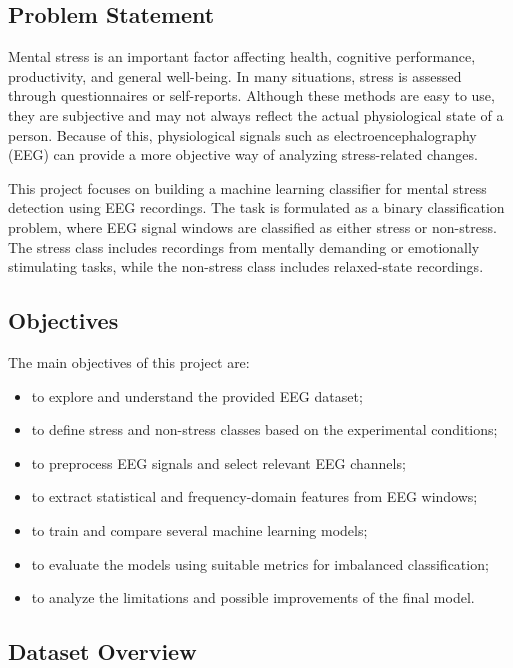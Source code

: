 \documentclass[12pt,a4paper]{article}
\begin{document}
	\subsection{Problem Statement}
	
	Mental stress is an important factor affecting health, cognitive performance, productivity, and general well-being. In many situations, stress is assessed through questionnaires or self-reports. Although these methods are easy to use, they are subjective and may not always reflect the actual physiological state of a person. Because of this, physiological signals such as electroencephalography (EEG) can provide a more objective way of analyzing stress-related changes.
	
	This project focuses on building a machine learning classifier for mental stress detection using EEG recordings. The task is formulated as a binary classification problem, where EEG signal windows are classified as either stress or non-stress. The stress class includes recordings from mentally demanding or emotionally stimulating tasks, while the non-stress class includes relaxed-state recordings.
	
	\subsection{Objectives}
	
	The main objectives of this project are:
	
	\begin{itemize}
		\item to explore and understand the provided EEG dataset;
		\item to define stress and non-stress classes based on the experimental conditions;
		\item to preprocess EEG signals and select relevant EEG channels;
		\item to extract statistical and frequency-domain features from EEG windows;
		\item to train and compare several machine learning models;
		\item to evaluate the models using suitable metrics for imbalanced classification;
		\item to analyze the limitations and possible improvements of the final model.
	\end{itemize}
	
	\subsection{Dataset Overview}
	
\end{document}
